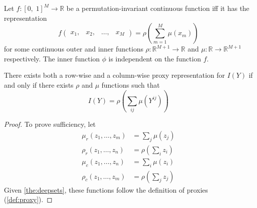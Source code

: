 \begin{appendices}

\begin{theorem}
\label{the:deepsets}

Let $f\colon[0,\; 1]^M \to \mathbb{R}$ be a permutation-invariant continuous function iff it has the representation
\begin{equation}
    f\begin{pmatrix}
        x_1, & x_2, & \dots, & x_M 
    \end{pmatrix}
    = \rho\left(\sum_{m=1}^M\mu(x_m)\right)
\end{equation}
for some continuous outer and inner functions $\rho \colon \mathbb{R}^{M+1}\to \mathbb{R}$ and $\mu \colon \mathbb{R}\to \mathbb{R}^{M+1}$ respectively. The inner function $\phi$ is independent on the function $f$.

\end{theorem}

\begin{theorem}
\label{the:oxytrees}
There exists both a row-wise and a column-wise proxy representation for $I(Y)$ if and only if there exists $\rho$ and $\mu$ functions such that 
\begin{equation}
    I(Y)=\rho\left(\sum_{ij}\mu(Y^{ij})\right)
\end{equation}
\end{theorem}
\begin{proof}
To prove sufficiency, let 
\begin{align}
    \mu_r(z_1, \dots, z_m) &= \sum_j \mu(z_j)\\
    \rho_r(z_1, \dots, z_n) &= \rho\left(\sum_{i}z_i\right)\\
    \mu_c(z_1, \dots, z_n) &= \sum_i \mu(z_i)\\
    \rho_c(z_1, \dots, z_m) &= \rho\left(\sum_{j}z_j\right)
\end{align}
%
Given \cref{the:deepsets}, these functions follow the definition of proxies (\cref{def:proxy}).


\end{proof}
\end{appendices}
